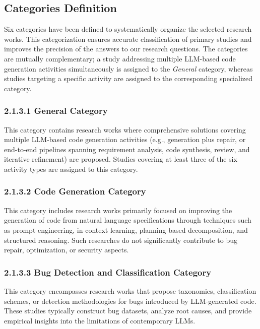 \documentclass[11pt,a4paper]{article}
\begin{document}
\subsection{Categories Definition}
\label{sec:categories}

Six categories have been defined to systematically organize the selected research works. This categorization ensures accurate classification of primary studies and improves the precision of the answers to our research questions. The categories are mutually complementary; a study addressing multiple LLM-based code generation activities simultaneously is assigned to the \textit{General} category, whereas studies targeting a specific activity are assigned to the corresponding specialized category.

\subsubsection*{2.1.3.1 General Category}
This category contains research works where comprehensive solutions covering multiple LLM-based code generation activities (e.g., generation plus repair, or end-to-end pipelines spanning requirement analysis, code synthesis, review, and iterative refinement) are proposed. Studies covering at least three of the six activity types are assigned to this category.

\subsubsection*{2.1.3.2 Code Generation Category}
This category includes research works primarily focused on improving the generation of code from natural language specifications through techniques such as prompt engineering, in-context learning, planning-based decomposition, and structured reasoning. Such researches do not significantly contribute to bug repair, optimization, or security aspects.

\subsubsection*{2.1.3.3 Bug Detection and Classification Category}
This category encompasses research works that propose taxonomies, classification schemes, or detection methodologies for bugs introduced by LLM-generated code. These studies typically construct bug datasets, analyze root causes, and provide empirical insights into the limitations of contemporary LLMs.
\end{document}
